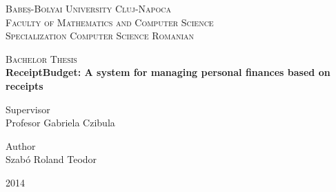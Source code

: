 \begin{titlepage}
    \begin{center}
        \vspace*{1cm}
        
        \Large
        \textsc{Babeș-Bolyai University Cluj-Napoca} \\
		\textsc{Faculty of Mathematics and Computer Science} \\
		\textsc{Specialization Computer Science Romanian}

		\vspace{1.5cm}
        \Huge
        \textsc{Bachelor Thesis} \\[1cm]
        \textbf{ReceiptBudget: A system for managing personal finances based on receipts}
\end{center}        

        \vspace{2cm}
		\Large
        \begin{minipage}[t]{0.5\textwidth}
       		Supervisor \\
        	Profesor Gabriela Czibula \\
		\end{minipage}
		\begin{minipage}[t]{0.5\textwidth}
			\begin{flushright}
				Author \\
				Szabó Roland Teodor
			\end{flushright}
		\end{minipage}
        \vfill

        \vspace{0.8cm}
\begin{center}
	\Huge
        2014
\end{center}
        
\end{titlepage}